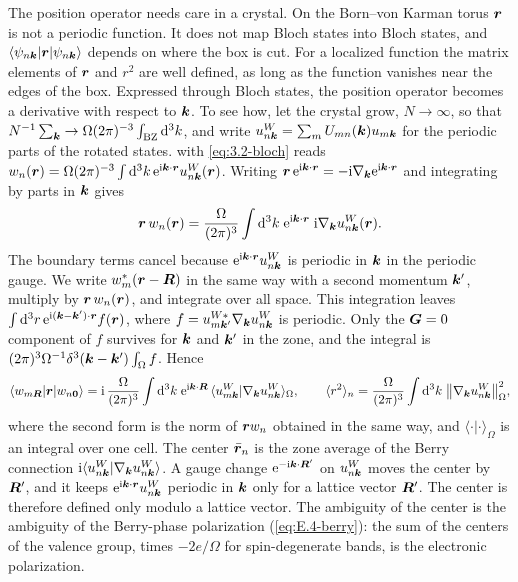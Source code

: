 The position operator needs care in a crystal. On the Born--von Karman torus $\bm{r}$ is not a periodic function. It does not map Bloch states into Bloch states, and $\langle\psi_{n\bm{k}}|\bm{r}|\psi_{n\bm{k}}\rangle$ depends on where the box is cut. For a localized function the matrix elements of $\bm{r}$ and $r^2$ are well defined, as long as the function vanishes near the edges of the box. Expressed through Bloch states, the position operator becomes a derivative with respect to $\bm{k}$. To see how, let the crystal grow, $N\to\infty$, so that $N^{-1}\sum_{\bm{k}} \to \Omega(2\pi)^{-3}\int_{\mathrm{BZ}}\mathrm{d}^3k$, and write $u^W_{n\bm{k}} = \sum_mU_{mn}(\bm{k})u_{m\bm{k}}$ for the periodic parts of the rotated states.  with \cref{eq:3.2-bloch} reads $w_n(\bm{r}) = \Omega(2\pi)^{-3}\int\mathrm{d}^3k\,\mathrm{e}^{\mathrm{i}\bm{k}\cdot\bm{r}}u^W_{n\bm{k}}(\bm{r})$. Writing $\bm{r}\,\mathrm{e}^{\mathrm{i}\bm{k}\cdot\bm{r}} = -\mathrm{i}\nabla_{\bm{k}}\mathrm{e}^{\mathrm{i}\bm{k}\cdot\bm{r}}$ and integrating by parts in $\bm{k}$ gives
\begin{equation*}
  \bm{r}\,w_n(\bm{r}) = \frac{\Omega}{(2\pi)^3}\int\mathrm{d}^3k\;\mathrm{e}^{\mathrm{i}\bm{k}\cdot\bm{r}}\;\mathrm{i}\nabla_{\bm{k}}u^W_{n\bm{k}}(\bm{r}) .
\end{equation*}
The boundary terms cancel because $\mathrm{e}^{\mathrm{i}\bm{k}\cdot\bm{r}}u^W_{n\bm{k}}$ is periodic in $\bm{k}$ in the periodic gauge. We write $w^*_m(\bm{r} - \bm{R})$ in the same way with a second momentum $\bm{k}'$, multiply by $\bm{r}\,w_n(\bm{r})$, and integrate over all space. This integration leaves $\int\mathrm{d}^3r\,\mathrm{e}^{\mathrm{i}(\bm{k} - \bm{k}')\cdot\bm{r}}f(\bm{r})$, where $f = u^{W*}_{m\bm{k}'}\nabla_{\bm{k}}u^W_{n\bm{k}}$ is periodic. Only the $\bm{G} = 0$ component of $f$ survives for $\bm{k}$ and $\bm{k}'$ in the zone, and the integral is $(2\pi)^3\Omega^{-1}\delta^3(\bm{k} - \bm{k}')\int_\Omega f$. Hence~\cite[Eqs.~(4) and (8)]{marzari1997maximally}
\begin{equation}
  \langle w_{m\bm{R}}|\bm{r}|w_{n\bm{0}}\rangle = \mathrm{i}\,\frac{\Omega}{(2\pi)^3}\int\mathrm{d}^3k\;\mathrm{e}^{\mathrm{i}\bm{k}\cdot\bm{R}}\,\langle u^W_{m\bm{k}}|\nabla_{\bm{k}}u^W_{n\bm{k}}\rangle_\Omega, \qquad
  \langle r^2\rangle_n = \frac{\Omega}{(2\pi)^3}\int\mathrm{d}^3k\;\bigl\|\nabla_{\bm{k}}u^W_{n\bm{k}}\bigr\|_\Omega^2 ,
  \label{eq:3.6-blount}
\end{equation}
where the second form is the norm of $\bm{r}w_n$ obtained in the same way, and $\langle\cdot|\cdot\rangle_\Omega$ is an integral over one cell. The center $\bar{\bm{r}}_n$ is the zone average of the Berry connection $\mathrm{i}\langle u^W_{n\bm{k}}|\nabla_{\bm{k}}u^W_{n\bm{k}}\rangle$. A gauge change $\mathrm{e}^{-\mathrm{i}\bm{k}\cdot\bm{R}'}$ on $u^W_{n\bm{k}}$ moves the center by $\bm{R}'$, and it keeps $\mathrm{e}^{\mathrm{i}\bm{k}\cdot\bm{r}}u^W_{n\bm{k}}$ periodic in $\bm{k}$ only for a lattice vector $\bm{R}'$. The center is therefore defined only modulo a lattice vector. The ambiguity of the center is the ambiguity of the Berry-phase polarization (\cref{eq:E.4-berry}): the sum of the centers of the valence group, times $-2e/\Omega$ for spin-degenerate bands, is the electronic polarization.

